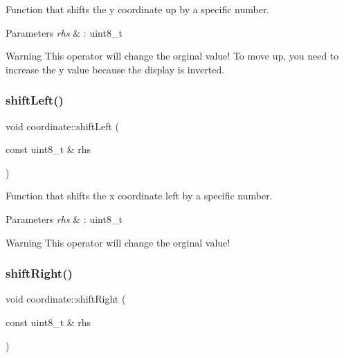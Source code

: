 Function that shifts the y coordinate up by a specific number. 


\begin{DoxyParams}{Parameters}
{\em rhs} & \+: uint8\+\_\+t \\
\hline
\end{DoxyParams}
\begin{DoxyWarning}{Warning}
This operator will change the orginal value! To move up, you need to increase the y value because the display is inverted. 
\end{DoxyWarning}
\mbox{\label{classcoordinate_aa5d646342017b7c48ddbcd74bd48e352}} 
\subsubsection{\texorpdfstring{shift\+Left()}{shiftLeft()}}
{\footnotesize\ttfamily void coordinate\+::shift\+Left (\begin{DoxyParamCaption}\item[{const uint8\+\_\+t \&}]{rhs }\end{DoxyParamCaption})\hspace{0.3cm}{\ttfamily [inline]}}



Function that shifts the x coordinate left by a specific number. 


\begin{DoxyParams}{Parameters}
{\em rhs} & \+: uint8\+\_\+t \\
\hline
\end{DoxyParams}
\begin{DoxyWarning}{Warning}
This operator will change the orginal value! 
\end{DoxyWarning}
\mbox{\label{classcoordinate_aa723f2bf9768db3fd3874376702f2283}} 
\subsubsection{\texorpdfstring{shift\+Right()}{shiftRight()}}
{\footnotesize\ttfamily void coordinate\+::shift\+Right (\begin{DoxyParamCaption}\item[{const uint8\+\_\+t \&}]{rhs }\end{DoxyParamCaption})\hspace{0.3cm}{\ttfamily [inline]}}



